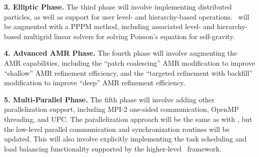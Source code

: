 \documentclass[10pt,twocolumn]{article}
\begin{document}
\textbf{3. Elliptic Phase.}  The third phase will involve implementing
distributed particles, as well as support for user level- and
hierarchy-based operations.  \enzoii\ will be augmented with a PPPM
method, including associated level- and hierarchy-based multigrid
linear solvers for solving Poisson's equation for self-gravity.

\textbf{4. Advanced AMR Phase.} The fourth phase will involve augmenting the
AMR capabilities, including the ``patch coalescing'' AMR modification
to improve ``shallow'' AMR refinement efficiency, and the ``targeted
refinement with backfill'' modification to improve ``deep'' AMR
refinement efficiency.

\textbf{5. Multi-Parallel Phase.}  The fifth phase will involve adding
other parallelization support, including MPI-2 one-sided
communication, OpenMP threading, and UPC.  The parallelization
approach will be the same as with \charm, but the low-level parallel
communication and synchronization routines will be updated.  This will
also involve explicitly implementing the task scheduling and load
balancing functionality supported by the higher-level \charm\
framework.




\end{document}
